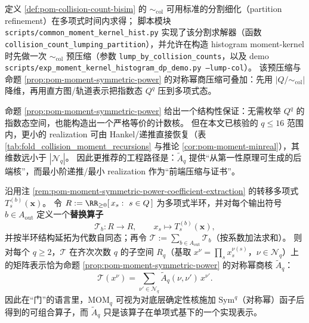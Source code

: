 \begin{remark}\label{rem:pom-moment-col-lumping-impl}
定义 \ref{def:pom-collision-count-bisim} 的 \(\sim_{\mathrm{col}}\) 可用标准的分割细化（partition refinement）在多项式时间内求得；
脚本模块 \texttt{scripts/common\_moment\_kernel\_hist.py} 实现了该分割求解器（函数 \texttt{collision\_count\_lumping\_partition}），并允许在构造 histogram moment-kernel 时先做一次 \(\sim_{\mathrm{col}}\) 预压缩（参数 \texttt{lump\_by\_collision\_counts}，以及 demo \texttt{scripts/exp\_moment\_kernel\_histogram\_dp\_demo.py --lump-col}）。
该预压缩与命题 \ref{prop:pom-moment-symmetric-power} 的对称幂商压缩可叠加：先用 \(|Q/{\sim_{\mathrm{col}}}|\) 降维，再用直方图/轨道表示把指数态 \(Q^q\) 压到多项式态。
\end{remark}

\begin{remark}\label{rem:pom-moment-symmetric-power-impl}
命题 \ref{prop:pom-moment-symmetric-power} 给出一个结构性保证：无需枚举 \(Q^q\) 的指数态空间，也能构造出一个严格等价的计数核。
但在本文已核验的 \(q\le 16\) 范围内，更小的 realization 可由 Hankel/递推直接恢复（表 \ref{tab:fold_collision_moment_recursions} 与推论 \ref{cor:pom-moment-minreal}），其维数远小于 \(|\mathcal{N}_q|\)。
因此更推荐的工程路径是：\(\widetilde A_q\) 提供“从第一性原理可生成的后端核”，而最小阶递推/最小 realization 作为“前端压缩与证书”。
\end{remark}

\begin{remark}\label{rem:pom-moment-symmetric-power-substitution-operator}
沿用注 \ref{rem:pom-moment-symmetric-power-coefficient-extraction} 的转移多项式 \(T^{(b)}_s(\mathbf{x})\)。
令 \(R:=\RR_{\ge 0}[\,x_s:\ s\in Q\,]\) 为多项式半环，并对每个输出符号 \(b\in A_{\mathrm{out}}\) 定义一个\textbf{替换算子}
\[
\mathcal{T}_b:R\to R,\qquad
x_s\longmapsto T^{(b)}_s(\mathbf{x}),
\]
并按半环结构延拓为代数自同态；再令 \(\mathcal{T}:=\sum_{b\in A_{\mathrm{out}}}\mathcal{T}_b\)（按系数加法求和）。
则对每个 \(q\ge 2\)，\(\mathcal{T}\) 在齐次次数 \(q\) 的子空间 \(R_q\)（基取 \(x^\nu=\prod_s x_s^{\nu(s)}\)，\(\nu\in\mathcal{N}_q\)）上的矩阵表示恰为命题 \ref{prop:pom-moment-symmetric-power} 的对称幂商核 \(\widetilde A_q\)：
\[
\mathcal{T}(x^\nu)=\sum_{\nu'\in\mathcal{N}_q}\widetilde A_q(\nu,\nu')\,x^{\nu'}.
\]
因此在“门”的语言里，\(\mathrm{MOM}_q\) 可视为对底层确定性核施加 \(\mathrm{Sym}^q\)（对称幂）函子后得到的可组合算子，而 \(\widetilde A_q\) 只是该算子在单项式基下的一个实现表示。
\end{remark}

